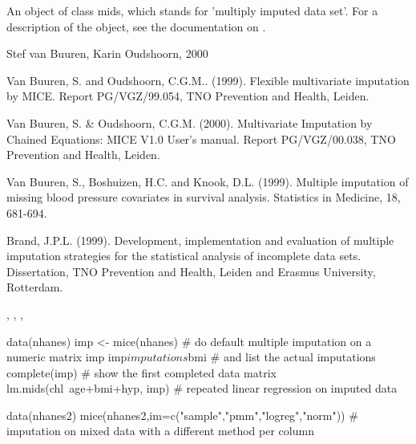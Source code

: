 \documentclass{article}
\begin{document}
\begin{Value}
An object of class mids, which stands for 'multiply imputed data set'. For 
a description of the object, see the documentation on .
\end{Value}
\begin{Author}\relax
Stef van Buuren, Karin Oudshoorn, 2000
\end{Author}
\begin{References}\relax
Van Buuren, S. and Oudshoorn, C.G.M.. (1999). Flexible multivariate
imputation by MICE. Report PG/VGZ/99.054, TNO Prevention and Health,
Leiden. 

Van Buuren, S. \& Oudshoorn, C.G.M. (2000). Multivariate Imputation by
Chained Equations:  
MICE V1.0 User's manual. Report PG/VGZ/00.038, TNO Prevention and
Health, Leiden. 

Van Buuren, S., Boshuizen, H.C. and Knook, D.L. (1999). Multiple
imputation of missing blood pressure covariates in survival
analysis. Statistics in Medicine, 18, 681-694. 

Brand, J.P.L. (1999). Development, implementation and evaluation of multiple imputation strategies for the statistical analysis of incomplete data sets. Dissertation, TNO Prevention and Health, Leiden and Erasmus University, Rotterdam.
\end{References}
\begin{SeeAlso}\relax
{}, , , 
\end{SeeAlso}
\begin{Examples}
\begin{ExampleCode}
data(nhanes)
imp <- mice(nhanes)     # do default multiple imputation on a numeric matrix
imp
imp$imputations$bmi     # and list the actual imputations 
complete(imp)       # show the first completed data matrix
lm.mids(chl~age+bmi+hyp, imp)   # repeated linear regression on imputed data

data(nhanes2)
mice(nhanes2,im=c("sample","pmm","logreg","norm")) # imputation on mixed data with a different method per column
\end{ExampleCode}
\end{Examples}
\end{document}

